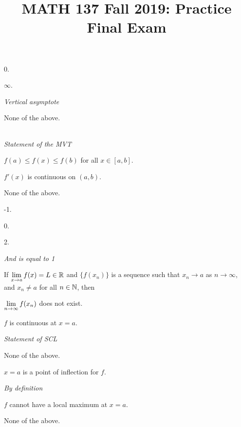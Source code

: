 \documentclass{agony}
\title{MATH 137 Fall 2019: Practice Final Exam}
\begin{document}
\thispagestyle{firstpage}
\textbf{\thetitle}


\begin{choices}
  \item 0.
  \item $\infty$.
  \item {} \emph{Vertical asymptote}
  \item None of the above.
\end{choices}
\begin{choices}
  \item {} \\
  \emph{Statement of the MVT}
  \item $f(a) \leq f(x) \leq f(b)$ for all $x\in[a,b]$.
  \item $f'(x)$ is continuous on $(a,b)$.
  \item None of the above.
\end{choices}
\begin{choices}
  \item -1.
  \item 0.
  \item 2.
  \item {} \emph{And is equal to 1}
\end{choices}
\begin{prob}
  If $\lim\limits_{x\to a} f(x) = L \in \mathbb{R}$ and $\{f(x_n)\}$ is a sequence such that
  $x_n \to a$ as $n \to \infty$, and $x_n \neq a$ for all $n \in \mathbb{N}$, then
\end{prob}
\begin{choices}
  \item $\lim\limits_{n\to\infty}f(x_n)$ does not exist.
  \item $f$ is continuous at $x=a$.
  \item {} \emph{Statement of SCL}
  \item None of the above.
\end{choices}
\begin{choices}
  \item $x=a$ is a point of inflection for $f$.
  \item {} \emph{By definition}
  \item $f$ cannot have a local maximum at $x=a$.
  \item None of the above.
\end{choices}
\end{document}
